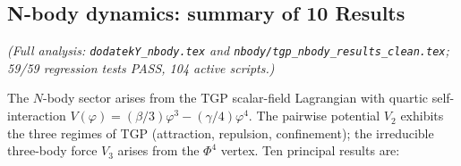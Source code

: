 \subsection{N-body dynamics: summary of 10 Results}%
\label{ssec:nbody-summary}

\noindent\textit{(Full analysis: \texttt{dodatekY\_nbody.tex} and
\texttt{nbody/tgp\_nbody\_results\_clean.tex}; 59/59 regression
tests PASS, 104 active scripts.)}

\medskip
The $N$-body sector arises from the TGP scalar-field Lagrangian
with quartic self-interaction $V(\varphi)
=(\beta/3)\varphi^{3}-(\gamma/4)\varphi^{4}$.  The pairwise
potential $V_{2}$ exhibits the three regimes of TGP (attraction,
repulsion, confinement); the irreducible three-body force $V_{3}$
arises from the $\Phi^{4}$ vertex.  Ten principal results are:

